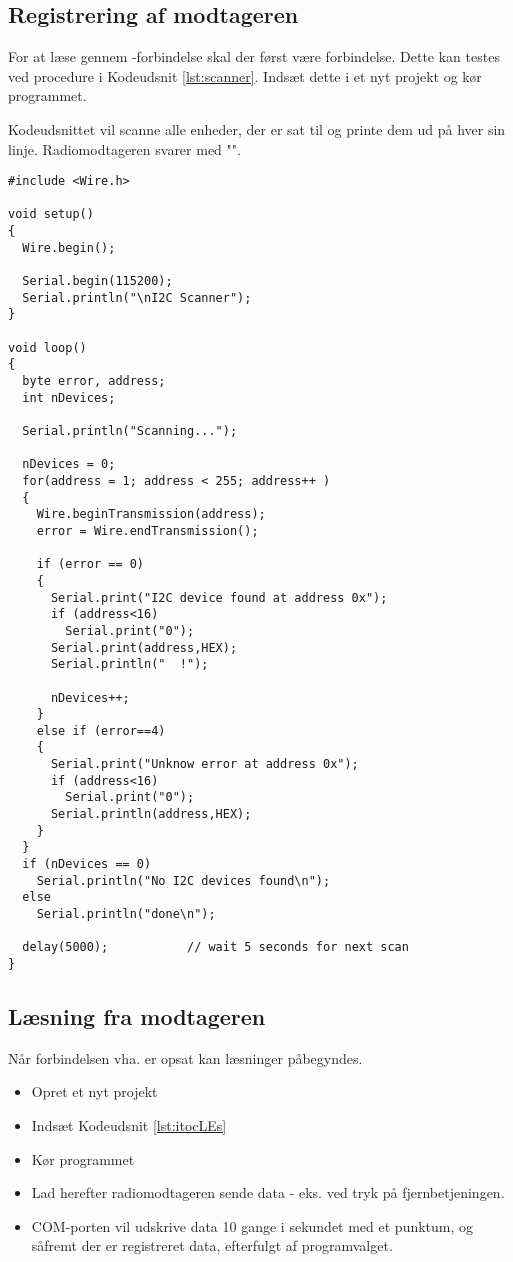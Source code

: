 \documentclass[Main]{subfiles}
\begin{document}
\subsection{Registrering af modtageren}
For at læse gennem \itoc-forbindelse skal der først være forbindelse.
Dette kan testes ved procedure i Kodeudsnit \ref{lst:scanner}.
Indsæt dette i et nyt projekt og kør programmet.

Kodeudsnittet vil scanne alle enheder, der er sat til \itoc og printe dem ud på hver sin linje.
Radiomodtageren svarer med "".

\begin{lstlisting}[caption=Scan efter \itoc enheder, style=Code-C, label=lst:scanner]
#include <Wire.h>

void setup()
{
  Wire.begin();

  Serial.begin(115200);
  Serial.println("\nI2C Scanner");
}

void loop()
{
  byte error, address;
  int nDevices;

  Serial.println("Scanning...");

  nDevices = 0;
  for(address = 1; address < 255; address++ ) 
  {
    Wire.beginTransmission(address);
    error = Wire.endTransmission();

    if (error == 0)
    {
      Serial.print("I2C device found at address 0x");
      if (address<16) 
        Serial.print("0");
      Serial.print(address,HEX);
      Serial.println("  !");

      nDevices++;
    }
    else if (error==4) 
    {
      Serial.print("Unknow error at address 0x");
      if (address<16) 
        Serial.print("0");
      Serial.println(address,HEX);
    }    
  }
  if (nDevices == 0)
    Serial.println("No I2C devices found\n");
  else
    Serial.println("done\n");

  delay(5000);           // wait 5 seconds for next scan
}
\end{lstlisting}


\newpage
\subsection{Læsning fra modtageren}
Når forbindelsen vha. \itoc er opsat kan læsninger påbegyndes.
\begin{itemize}
\item Opret et nyt projekt
\item Indsæt Kodeudsnit \ref{lst:itocLEs}
\item Kør programmet
\item Lad herefter radiomodtageren sende data - eks. ved tryk på fjernbetjeningen.
\item COM-porten vil udskrive data 10 gange i sekundet med et punktum, og såfremt der er registreret data, efterfulgt af programvalget.
\end{itemize}
\end{document}
